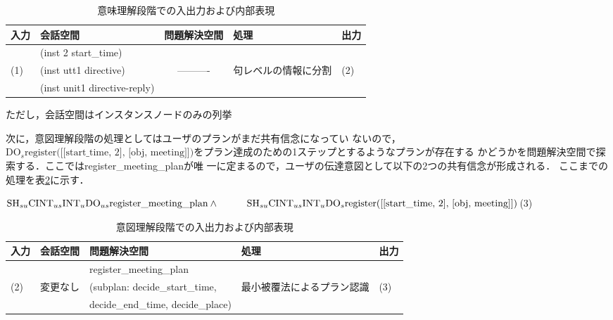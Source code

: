 \begin{table}[htbp]
\centering
\caption{意味理解段階での入出力および内部表現}
\label{ex-table1}
\begin{tabular}{|l|l|c|l|l|}
\hline
入力 & 会話空間 & 問題解決空間 & 処理 & 出力 \\
\hline
\hline
& (inst 2 start\_time)  & & & \\
(1) &  (inst utt1 directive)  & ---------- & 句レベルの情報に分割 & (2)\\
&  (inst unit1 directive-reply)  & & & \\
\hline
\end{tabular}

\medskip

ただし，会話空間はインスタンスノードのみの列挙

\end{table}

次に，意図理解段階の処理としてはユーザのプランがまだ共有信念になってい
ないので，\\$\mbox{DO}_s \mbox{register([[start\_time, 2], [obj,
meeting]])}$をプラン達成のための1ステップとするようなプランが存在する
かどうかを問題解決空間で探索する．ここではregister\_meeting\_planが唯
一に定まるので，ユーザの伝達意図として以下の2つの共有信念が形成される．
ここまでの処理を表\ref{ex-table2}に示す．

\noindent
\hspace*{1cm}
$\mbox{SH}_{su}\mbox{CINT}_{us} \mbox{INT}_u
\mbox{DO}_{us} \mbox{register\_meeting\_plan}  \land\\
\hspace*{1cm}
\mbox{SH}_{su} \mbox{CINT}_{us} \mbox{INT}_u \mbox{DO}_{s} 
\mbox{register([[start\_time, 2], [obj, meeting]])} 
$\hspace*{30mm}(3)
\setcounter{equation}{3}

\begin{table}[htbp]
\centering
\caption{意図理解段階での入出力および内部表現}
\label{ex-table2}
\begin{tabular}{|l|l|l|l|l|}
\hline
入力 & 会話空間 & 問題解決空間 & 処理 & 出力 \\
\hline
\hline
&   & register\_meeting\_plan & & \\
(2) &  変更なし  &  (subplan: decide\_start\_time, 
& 最小被覆法によるプラン認識 & (3)\\
&  & decide\_end\_time, decide\_place) & & \\
\hline
\end{tabular}
\end{table}

